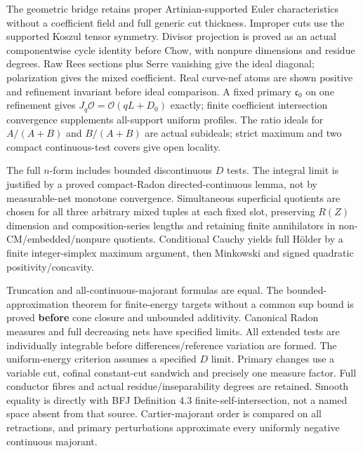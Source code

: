 \documentclass[
]{article}
\begin{document}
The geometric bridge retains proper Artinian-supported Euler
characteristics without a coefficient field and full generic cut
thickness. Improper cuts use the supported Koszul tensor symmetry.
Divisor projection is proved as an actual componentwise cycle identity
before Chow, with nonpure dimensions and residue degrees. Raw Rees
sections plus Serre vanishing give the ideal diagonal; polarization
gives the mixed coefficient. Real curve-nef atoms are shown positive and
refinement invariant before ideal comparison. A fixed primary
\(\mathfrak c_0\) on one refinement gives
\(J_q\mathcal O=\mathcal O(qL+D_0)\) exactly; finite coefficient
intersection convergence supplements all-support uniform profiles. The
ratio ideals for \(A/(A+B)\) and \(B/(A+B)\) are actual subideals;
strict maximum and two compact continuous-test covers give open
locality.

The full \(n\)-form includes bounded discontinuous \(D\) tests. The
integral limit is justified by a proved compact-Radon
directed-continuous lemma, not by measurable-net monotone convergence.
Simultaneous superficial quotients are chosen for all three arbitrary
mixed tuples at each fixed slot, preserving \(R(Z)\) dimension and
composition-series lengths and retaining finite annihilators in
non-CM/embedded/nonpure quotients. Conditional Cauchy yields full Hölder
by a finite integer-simplex maximum argument, then Minkowski and signed
quadratic positivity/concavity.

Truncation and all-continuous-majorant formulas are equal. The
bounded-approximation theorem for finite-energy targets without a common
sup bound is proved \textbf{before} cone closure and unbounded
additivity. Canonical Radon measures and full decreasing nets have
specified limits. All extended tests are individually integrable before
differences/reference variation are formed. The uniform-energy criterion
assumes a specified \(D\) limit. Primary changes use a variable cut,
cofinal constant-cut sandwich and precisely one measure factor. Full
conductor fibres and actual residue/inseparability degrees are retained.
Smooth equality is directly with BFJ Definition 4.3
finite-self-intersection, not a named space absent from that source.
Cartier-majorant order is compared on all retractions, and primary
perturbations approximate every uniformly negative continuous majorant.
\end{document}
